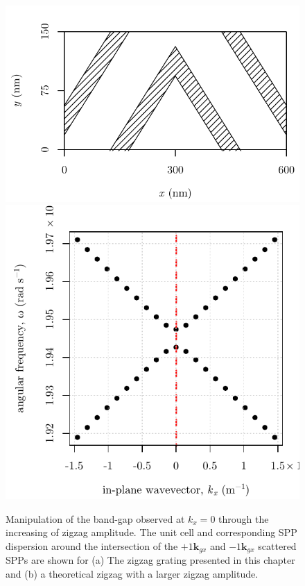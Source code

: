 \begin{figure}
\begin{center}
{\begin{minipage}{0.4\linewidth}
		\includegraphics[width=\linewidth]{./band-gap-figures/figure-symmetric-highamp-unitcell}	\\
			\includegraphics[width=\linewidth]{./band-gap-figures/figure-kgkgbandgap-150yoffset-dispersion.pdf}
		\end{minipage}
		}
	\end{center}
	\caption[Manipulation of the band-gap observed at $k_x=0$ through the increasing of zigzag amplitude.]{Manipulation of the band-gap observed at $k_x=0$ through the increasing of zigzag amplitude.  The unit cell and corresponding SPP dispersion around the intersection of the $+1\mathbf{k}_{gx}$ and $-1\mathbf{k}_{gx}$ scattered SPPs are shown for (a) The zigzag grating presented in this chapter and (b) a theoretical zigzag with a larger zigzag amplitude.  \label{fig:0kx-bandgap-amplitude-dependence}}
\end{figure}

